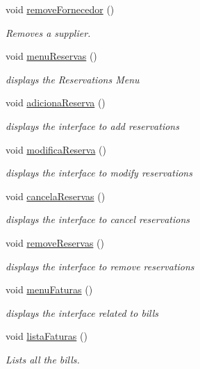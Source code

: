 \begin{DoxyCompactItemize}
void \hyperlink{classEmpresa_a9aa7b7e699971eb2e28f0db99c6500c4}{remove\+Fornecedor} ()
\begin{DoxyCompactList}\small\item\em Removes a supplier. \end{DoxyCompactList}\item 
void \hyperlink{classEmpresa_a0d362cb7362b859ccf99b9603de6b603}{menu\+Reservas} ()
\begin{DoxyCompactList}\small\item\em displays the Reservations Menu \end{DoxyCompactList}\item 
void \hyperlink{classEmpresa_a42953bdbb2fb39173ad6f38892fc122b}{adiciona\+Reserva} ()
\begin{DoxyCompactList}\small\item\em displays the interface to add reservations \end{DoxyCompactList}\item 
void \hyperlink{classEmpresa_ae74f80c120a14f0591d04fe7603e6905}{modifica\+Reserva} ()
\begin{DoxyCompactList}\small\item\em displays the interface to modify reservations \end{DoxyCompactList}\item 
void \hyperlink{classEmpresa_aa0b169a112c75b6fd1bc80128720282e}{cancela\+Reservas} ()
\begin{DoxyCompactList}\small\item\em displays the interface to cancel reservations \end{DoxyCompactList}\item 
void \hyperlink{classEmpresa_a3e0ee0b5d92f0cd655a26095229849f1}{remove\+Reservas} ()
\begin{DoxyCompactList}\small\item\em displays the interface to remove reservations \end{DoxyCompactList}\item 
void \hyperlink{classEmpresa_a58d040d3983d55414d5c6fac5ac3b6c5}{menu\+Faturas} ()
\begin{DoxyCompactList}\small\item\em displays the interface related to bills \end{DoxyCompactList}\item 
void \hyperlink{classEmpresa_ab1950b5b5e9fca80823b5d01c6c1de6f}{lista\+Faturas} ()
\begin{DoxyCompactList}\small\item\em Lists all the bills. \end{DoxyCompactList}\item 

\end{DoxyCompactItemize}
